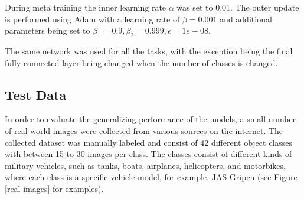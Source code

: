 During meta training the inner learning rate $\alpha$ was set to 0.01. The outer update is performed using Adam with a learning rate of $\beta =0.001$ and additional parameters being set to $\beta_1=0.9, \beta_2=0.999, \epsilon=1e-08$.

The same network was used for all the tasks, with the exception being the final fully connected layer being changed when the number of classes is changed.

\subsection{Test Data}\label{test data}
In order to evaluate the generalizing performance of the models, a small number of real-world images were collected from various sources on the internet. The collected dataset was manually labeled and consist of 42 different object classes with between 15 to 30 images per class. The classes consist of different kinds of military vehicles, such as tanks, boats, airplanes, helicopters, and motorbikes, where each class is a specific vehicle model, for example, JAS Gripen (see Figure \ref{real-images} for examples). %

